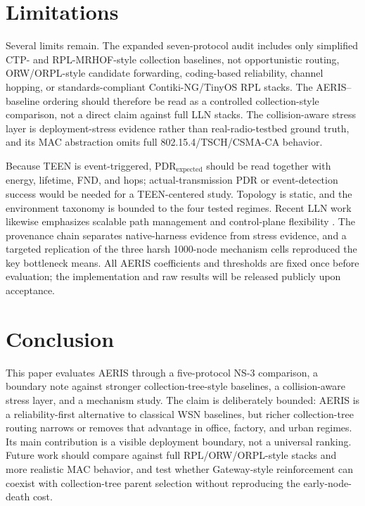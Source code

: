 \documentclass[conference]{IEEEtran}
\begin{document}
\section{Limitations}
Several limits remain. The expanded seven-protocol audit includes only simplified CTP- and RPL-MRHOF-style collection baselines, not opportunistic routing, ORW/ORPL-style candidate forwarding, coding-based reliability, channel hopping, or standards-compliant Contiki-NG/TinyOS RPL stacks. The AERIS--baseline ordering should therefore be read as a controlled collection-style comparison, not a direct claim against full LLN stacks. The collision-aware stress layer is deployment-stress evidence rather than real-radio-testbed ground truth, and its MAC abstraction omits full 802.15.4/TSCH/CSMA-CA behavior.

Because TEEN is event-triggered, $\mathrm{PDR}_{\mathrm{expected}}$ should be read together with energy, lifetime, FND, and hops; actual-transmission PDR or event-detection success would be needed for a TEEN-centered study. Topology is static, and the environment taxonomy is bounded to the four tested regimes. Recent LLN work likewise emphasizes scalable path management and control-plane flexibility \cite{almutairi2024survey,djennadi2025exploring}. The provenance chain separates native-harness evidence from stress evidence, and a targeted replication of the three harsh 1000-node mechanism cells reproduced the key bottleneck means. All AERIS coefficients and thresholds are fixed once before evaluation; the implementation and raw results will be released publicly upon acceptance.

\section{Conclusion}
This paper evaluates AERIS through a five-protocol NS-3 comparison, a boundary note against stronger collection-tree-style baselines, a collision-aware stress layer, and a mechanism study. The claim is deliberately bounded: AERIS is a reliability-first alternative to classical WSN baselines, but richer collection-tree routing narrows or removes that advantage in office, factory, and urban regimes. Its main contribution is a visible deployment boundary, not a universal ranking. Future work should compare against full RPL/ORW/ORPL-style stacks and more realistic MAC behavior, and test whether Gateway-style reinforcement can coexist with collection-tree parent selection without reproducing the early-node-death cost.

\FloatBarrier


\end{document}
